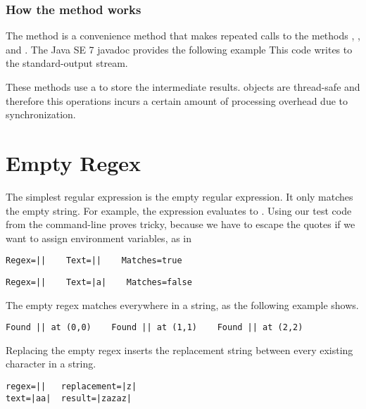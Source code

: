 \subsubsection{How the  method works }\label{section:regex-replaceAll}

The  method is a convenience method that makes
repeated calls to the methods , , and .
The Java SE 7 javadoc provides the following example
%
%
This code writes  to the standard-output stream.

These methods use a  to store the intermediate results.
 objects are thread-safe and therefore this operations
incurs a certain amount of processing overhead due to synchronization.


\section{Empty Regex}\label{section:regex-empty}

The simplest regular expression is the empty regular expression.  It
only matches the empty string.  For example, the expression
 evaluates to
.  Using our test code from the command-line proves tricky,
because we have to escape the quotes if we want to assign environment
variables, as in 
%
\begin{verbatim}
Regex=||    Text=||    Matches=true
\end{verbatim}
%
\begin{verbatim}
Regex=||    Text=|a|    Matches=false
\end{verbatim}
The empty regex matches everywhere in a string, as the following example shows.
%
\begin{verbatim} 
Found || at (0,0)    Found || at (1,1)    Found || at (2,2)
\end{verbatim} 
Replacing the empty regex inserts the replacement string between every
existing character in a string.
\begin{verbatim}
regex=||   replacement=|z|
text=|aa|  result=|zazaz|
\end{verbatim}

